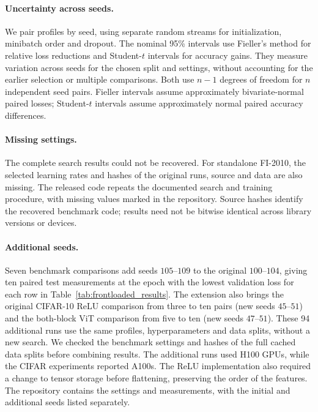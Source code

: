 \begin{minipage}{\textwidth}
\paragraph{Uncertainty across seeds.}
We pair profiles by seed, using separate random streams for initialization, minibatch order and dropout. The nominal 95\% intervals use Fieller's method for relative loss reductions and Student-$t$ intervals for accuracy gains. They measure variation across seeds for the chosen split and settings, without accounting for the earlier selection or multiple comparisons. Both use $n-1$ degrees of freedom for $n$ independent seed pairs. Fieller intervals assume approximately bivariate-normal paired losses; Student-$t$ intervals assume approximately normal paired accuracy differences.

\paragraph{Missing settings.}
The complete search results could not be recovered. For standalone FI-2010, the selected learning rates and hashes of the original runs, source and data are also missing. The released code repeats the documented search and training procedure, with missing values marked in the repository. Source hashes identify the recovered benchmark code; results need not be bitwise identical across library versions or devices.

\paragraph{Additional seeds.}
Seven benchmark comparisons add seeds $105$--$109$ to the original $100$--$104$, giving ten paired test measurements at the epoch with the lowest validation loss for each row in Table~\ref{tab:frontloaded_results}. The extension also brings the original CIFAR-10 ReLU comparison from three to ten pairs (new seeds $45$--$51$) and the both-block ViT comparison from five to ten (new seeds $47$--$51$). These 94 additional runs use the same profiles, hyperparameters and data splits, without a new search. We checked the benchmark settings and hashes of the full cached data splits before combining results. The additional runs used H100 GPUs, while the CIFAR experiments reported A100s. The ReLU implementation also required a change to tensor storage before flattening, preserving the order of the features. The repository contains the settings and measurements, with the initial and additional seeds listed separately.
\end{minipage}
\par\medskip
